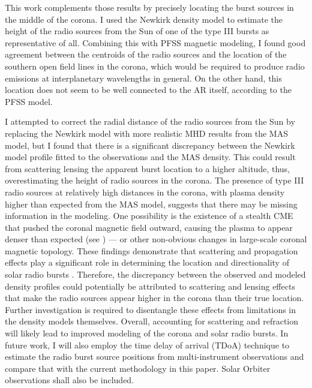 This work \citep{nedal_lofar_psp_2023} complements those results by precisely locating  the burst sources in the middle of the corona. I used the Newkirk density model to estimate the height of the radio sources from the Sun of one of the type III bursts as representative of all. Combining this with PFSS magnetic modeling, I found good agreement between the centroids of the radio sources and the location of the southern open field lines in the corona, which would be required to produce radio emissions at interplanetary wavelengths in general. On the other hand, this location does not seem to be well connected to the AR itself, according to the PFSS model.

I attempted to correct the radial distance of the radio sources from the Sun by replacing the Newkirk model with more realistic MHD results from the MAS model, but I found that there is a significant discrepancy between the Newkirk model profile fitted to the observations and the MAS density.
This could result from scattering lensing the apparent burst location to a higher altitude, thus, overestimating the height of radio sources in the corona.
The presence of type III radio sources at relatively high distances in the corona, with plasma density higher than expected from the MAS model, suggests that there may be missing information in the modeling. One possibility is the existence of a stealth CME that pushed the coronal magnetic field outward, causing the plasma to appear denser than expected (see \citet{dumbovic_2021}) — or other non-obvious changes in large-scale coronal magnetic topology.
These findings demonstrate that scattering and propagation effects play a significant role in determining the location and directionality of solar radio bursts \citep{kontar_2019, kontar_2023, chen_2023}. Therefore, the discrepancy between the observed and modeled density profiles could potentially be attributed to scattering and lensing effects that make the radio sources appear higher in the corona than their true location. Further investigation is required to disentangle these effects from limitations in the density models themselves. Overall, accounting for scattering and refraction will likely lead to improved modeling of the corona and solar radio bursts.
In future work, I will also employ the time delay of arrival (TDoA) technique \citep{zhang_2019} to estimate the radio burst source positions from multi-instrument observations and compare that with the current methodology in this paper. Solar Orbiter observations shall also be included.

